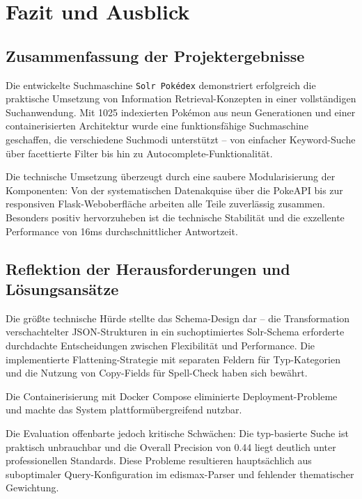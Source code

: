 \section{Fazit und Ausblick}
\label{chap:fazit}

\subsection{Zusammenfassung der Projektergebnisse}
\label{sec:fazit_zusammenfassung}

Die entwickelte Suchmaschine \texttt{Solr Pokédex} demonstriert erfolgreich die praktische Umsetzung von Information Retrieval-Konzepten in einer vollständigen Suchanwendung. Mit 1025 indexierten Pokémon aus neun Generationen und einer containerisierten Architektur wurde eine funktionsfähige Suchmaschine geschaffen, die verschiedene Suchmodi unterstützt -- von einfacher Keyword-Suche über facettierte Filter bis hin zu Autocomplete-Funktionalität.

Die technische Umsetzung überzeugt durch eine saubere Modularisierung der Komponenten: Von der systematischen Datenakquise über die PokeAPI bis zur responsiven Flask-Weboberfläche arbeiten alle Teile zuverlässig zusammen. Besonders positiv hervorzuheben ist die technische Stabilität und die exzellente Performance von 16ms durchschnittlicher Antwortzeit.

\subsection{Reflektion der Herausforderungen und Lösungsansätze}
\label{sec:fazit_herausforderungen}

Die größte technische Hürde stellte das Schema-Design dar – die Transformation verschachtelter JSON-Strukturen in ein suchoptimiertes Solr-Schema erforderte durchdachte Entscheidungen zwischen Flexibilität und Performance. Die implementierte Flattening-Strategie mit separaten Feldern für Typ-Kategorien und die Nutzung von Copy-Fields für Spell-Check haben sich bewährt.

Die Containerisierung mit Docker Compose eliminierte Deployment-Probleme und machte das System plattformübergreifend nutzbar.

Die Evaluation offenbarte jedoch kritische Schwächen: Die typ-basierte Suche ist praktisch unbrauchbar und die Overall Precision von 0.44 liegt deutlich unter professionellen Standards. Diese Probleme resultieren hauptsächlich aus suboptimaler Query-Konfiguration im edismax-Parser und fehlender thematischer Gewichtung.

